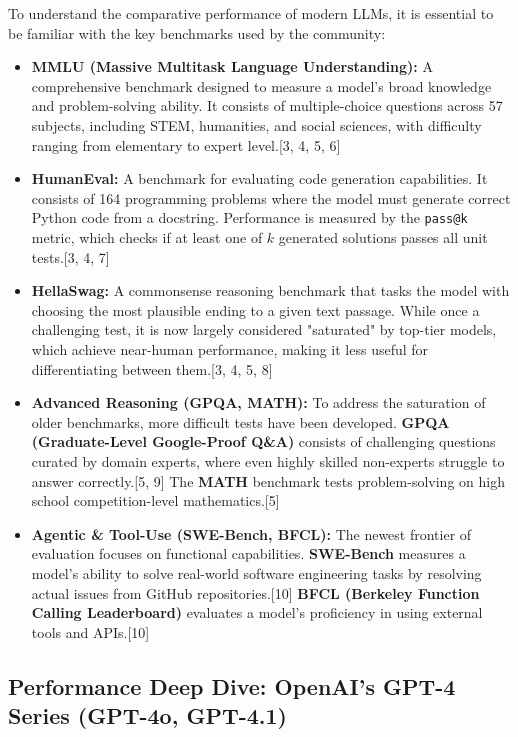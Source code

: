 \documentclass[12pt, a4paper]{article}
\begin{document}
To understand the comparative performance of modern LLMs, it is essential to be familiar with the key benchmarks used by the community:

\begin{itemize}
    \item \textbf{MMLU (Massive Multitask Language Understanding):} A comprehensive benchmark designed to measure a model's broad knowledge and problem-solving ability. It consists of multiple-choice questions across 57 subjects, including STEM, humanities, and social sciences, with difficulty ranging from elementary to expert level.[3, 4, 5, 6]
    \item \textbf{HumanEval:} A benchmark for evaluating code generation capabilities. It consists of 164 programming problems where the model must generate correct Python code from a docstring. Performance is measured by the \texttt{pass@k} metric, which checks if at least one of $k$ generated solutions passes all unit tests.[3, 4, 7]
    \item \textbf{HellaSwag:} A commonsense reasoning benchmark that tasks the model with choosing the most plausible ending to a given text passage. While once a challenging test, it is now largely considered "saturated" by top-tier models, which achieve near-human performance, making it less useful for differentiating between them.[3, 4, 5, 8]
    \item \textbf{Advanced Reasoning (GPQA, MATH):} To address the saturation of older benchmarks, more difficult tests have been developed. \textbf{GPQA (Graduate-Level Google-Proof Q\&A)} consists of challenging questions curated by domain experts, where even highly skilled non-experts struggle to answer correctly.[5, 9] The \textbf{MATH} benchmark tests problem-solving on high school competition-level mathematics.[5]
    \item \textbf{Agentic \& Tool-Use (SWE-Bench, BFCL):} The newest frontier of evaluation focuses on functional capabilities. \textbf{SWE-Bench} measures a model's ability to solve real-world software engineering tasks by resolving actual issues from GitHub repositories.[10] \textbf{BFCL (Berkeley Function Calling Leaderboard)} evaluates a model's proficiency in using external tools and APIs.[10]
\end{itemize}

\subsection{Performance Deep Dive: OpenAI's GPT-4 Series (GPT-4o, GPT-4.1)}
\end{document}
